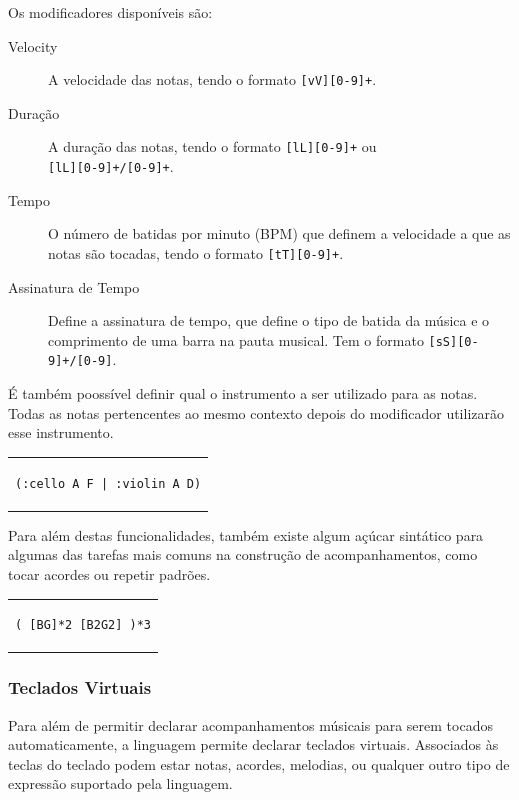 \documentclass[
  oneside,
  11pt, a4paper,
  footinclude=true,
  headinclude=true,
  cleardoublepage=empty
]{scrbook}
\begin{document}
Os modificadores disponíveis são:
\begin{description}
 \item[Velocity] A velocidade das notas, tendo o formato \texttt{[vV][0-9]+}.
 \item[Duração] A duração das notas, tendo o formato \texttt{[lL][0-9]+} ou \\ \texttt{[lL][0-9]+/[0-9]+}.
 \item[Tempo] O número de batidas por minuto (BPM) que definem a velocidade a que as notas são tocadas, tendo o formato \texttt{[tT][0-9]+}.
 \item[Assinatura de Tempo] Define a assinatura de tempo, que define o tipo de batida da música e o comprimento de uma barra na pauta musical. Tem o formato \texttt{[sS][0-9]+/[0-9]}.
\end{description}

É também poossível definir qual o instrumento a ser utilizado para as notas. Todas as notas pertencentes ao mesmo contexto depois do modificador utilizarão esse instrumento.

\begin{center}
\begin{tabular}{c}
\begin{lstlisting}[backgroundcolor=\color{transparent}]
 (:cello A F | :violin A D)
\end{lstlisting}
\end{tabular}
\end{center}

Para além destas funcionalidades, também existe algum açúcar sintático para algumas das tarefas mais comuns na construção de acompanhamentos, como tocar acordes ou repetir padrões.

\begin{center}
\begin{tabular}{c}
\begin{lstlisting}[backgroundcolor=\color{transparent}]
( [BG]*2 [B2G2] )*3
\end{lstlisting}
\end{tabular}
\end{center}
    
    \subsubsection{Teclados Virtuais}
    Para além de permitir declarar acompanhamentos músicais para serem tocados automaticamente, a linguagem permite declarar teclados virtuais. Associados às teclas do teclado podem estar notas, acordes, melodias, ou qualquer outro tipo de expressão suportado pela linguagem.
    
\end{document}
